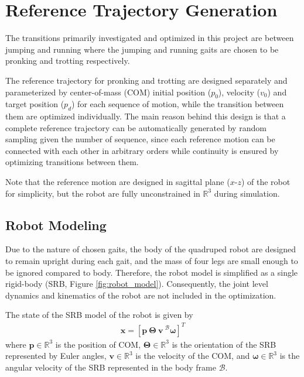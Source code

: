 \documentclass[11pt, conference]{IEEEtran}
\theoremstyle{definition} %
\newcommand{\RR}{\mathbb{R}}
\begin{document}
\section{Reference Trajectory Generation}

The transitions primarily investigated and optimized in this project are between jumping and running where the jumping and running gaits are chosen to be pronking and trotting respectively.

The reference trajectory for pronking and trotting are designed separately and parameterized by center-of-mass (COM) initial position ($p_0$), velocity ($v_0$) and target position ($p_d$) for each sequence of motion, while the transition between them are optimized individually. The main reason behind this design is that a complete reference trajectory can be automatically generated by random sampling given the number of sequence, since each reference motion can be connected with each other in arbitrary orders while continuity is ensured by optimizing transitions between them.

Note that the reference motion are designed in sagittal plane ($x$-$z$) of the robot for simplicity, but the robot are fully unconstrained in $\RR^3$ during simulation.

\subsection{Robot Modeling}
Due to the nature of chosen gaits, the body of the quadruped robot are designed to remain upright during each gait, and the mass of four legs are small enough to be ignored compared to body. Therefore, the robot model is simplified as a single rigid-body (SRB, Figure \ref{fig:robot_model}). Consequently, the joint level dynamics and kinematics of the robot are not included in the optimization.

The state of the SRB model of the robot is given by
\begin{align}
    \mathbf{x} = [\mathbf{p}\ \boldsymbol{\Theta}\ \mathbf{v}\ {^\mathcal{B}\boldsymbol{\omega}}]^T
\end{align}
where $\mathbf{p}\in\RR^3$ is the position of COM, $\boldsymbol{\Theta}\in\RR^3$ is the orientation of the SRB represented by Euler angles, $\mathbf{v}\in\RR^3$ is the velocity of the COM, and $\boldsymbol{\omega}\in\RR^3$
is the angular velocity of the SRB represented in the body frame $\mathcal{B}$.
\end{document}
